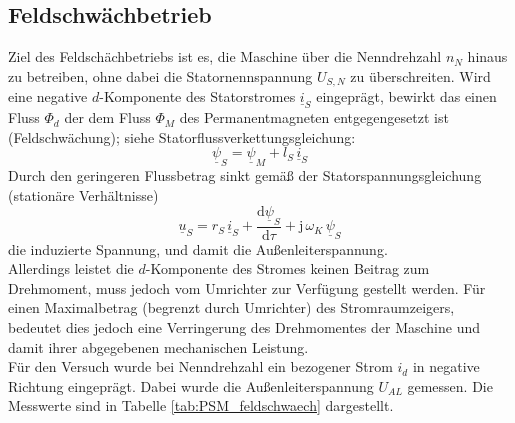 \clearpage 

\subsection{Feldschwächbetrieb} 
Ziel des Feldschächbetriebs ist es, die Maschine über die Nenndrehzahl $n_N$ hinaus zu betreiben, ohne dabei die Statornennspannung $U_{S,N}$ zu überschreiten. Wird eine negative $d$-Komponente des Statorstromes $\underline{i}_S$ eingeprägt, bewirkt das einen Fluss $\Phi_d$ der dem Fluss $\Phi_M$ des Permanentmagneten entgegengesetzt ist (Feldschwächung); siehe Statorflussverkettungsgleichung:\\
\begin{equation*}
     \underline{\psi}_S= \underline{\psi}_M+l_S\,\underline{i}_S
\end{equation*}
Durch den geringeren Flussbetrag sinkt gemäß der Statorspannungsgleichung (stationäre Verhältnisse)
\begin{equation*}
     \underline{u}_S=r_S\,\underline{i}_S+\frac{\mathrm{d}\underline{\psi}_S}{\mathrm{d}\tau}+\mathrm{j}\,\omega_K\,\underline{\psi}_S
\end{equation*}
die induzierte Spannung, und damit die Außenleiterspannung.\\
Allerdings leistet die $d$-Komponente des Stromes keinen Beitrag zum Drehmoment, muss jedoch vom Umrichter zur Verfügung gestellt werden. Für einen Maximalbetrag (begrenzt durch Umrichter) des Stromraumzeigers, bedeutet dies jedoch eine Verringerung des Drehmomentes der Maschine und damit ihrer abgegebenen mechanischen Leistung.\\
Für den Versuch wurde bei Nenndrehzahl ein bezogener Strom $i_d$ in negative Richtung eingeprägt. Dabei wurde die Außenleiterspannung $U_{AL}$ gemessen. Die Messwerte sind in Tabelle \ref{tab:PSM_feldschwaech} dargestellt.

